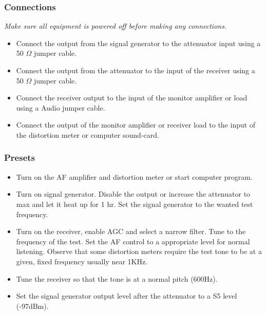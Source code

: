 \documentclass[10pt,letterpaper]{book}
\begin{document}
\subsubsection*{Connections}
\emph{Make sure all equipment is powered off before making any connections.}
\begin{itemize}
	\item Connect the output from the signal generator to the attenuator input using a 50 $\Omega$ jumper cable.
	\item Connect the output from the attenuator to the input of the receiver using a 50 $\Omega$ jumper cable.
	\item Connect the receiver output to the input of the monitor amplifier or load using a Audio jumper cable. 
	\item Connect the output of the monitor amplifier or receiver load to the input of the distortion meter or computer sound-card.
\end{itemize}
\subsubsection*{Presets}
\begin{itemize}
	\item Turn on the AF amplifier and distortion meter or start computer program. 
	\item Turn on signal generator. Disable the output or increase the attenuator to max and let it heat up for 1 hr. Set the signal generator to the wanted test frequency. 
	\item Turn on the receiver, enable AGC and select a narrow filter. Tune to the frequency of the test. Set the AF control to a appropriate level for normal listening. Observe that some distortion meters require the test tone to be at a given, fixed frequency usually near 1KHz.
	\item Tune the receiver so that the tone is at a normal pitch (600Hz).
	\item Set the signal generator output level after the attenuator to a S5 level (-97dBm). 
\end{itemize}
\end{document}
